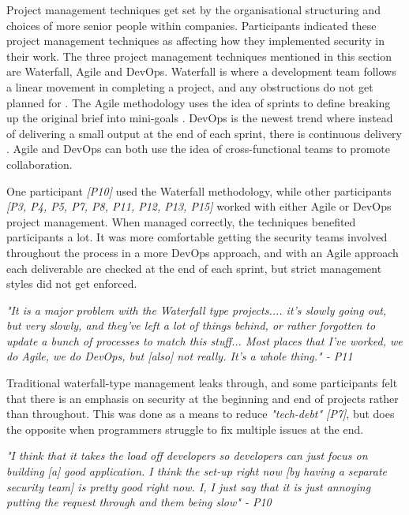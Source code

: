 \par Project management techniques get set by the organisational structuring and choices of more senior people within companies. Participants indicated these project management techniques as affecting how they implemented security in their work. The three project management techniques mentioned in this section are Waterfall, Agile and DevOps. Waterfall is where a development team follows a linear movement in completing a project, and any obstructions do not get planned for \cite{water}. The Agile methodology uses the idea of sprints to define breaking up the original brief into mini-goals \cite{water}. DevOps is the newest trend where instead of delivering a small output at the end of each sprint, there is continuous delivery \cite{ubiq}. Agile and DevOps can both use the idea of cross-functional teams to promote collaboration. 
\newline
\par 
One participant \textit{[P10]} used the Waterfall methodology, while other participants \textit{[P3, P4, P5, P7, P8, P11, P12, P13, P15]} worked with either Agile or DevOps project management. When managed correctly, the techniques benefited participants a lot. It was more comfortable getting the security teams involved throughout the process in a more DevOps approach, and with an Agile approach each deliverable are checked at the end of each sprint, but strict management styles did not get enforced. 
\newline
\par
\textit{"It is a major problem with the Waterfall type projects.... it's slowly going out, but very slowly, and they've left a lot of things behind, or rather forgotten to update a bunch of processes to match this stuff... Most places that I've worked, we do Agile, we do DevOps, but [also] not really. It's a whole thing." - P11}
\newline
\par
Traditional waterfall-type management leaks through, and some participants felt that there is an emphasis on security at the beginning and end of projects rather than throughout. This was done as a means to reduce \textit{"tech-debt" [P7]}, but does the opposite when programmers struggle to fix multiple issues at the end. 
\newline
\par 
\textit{"I think that it takes the load off developers so developers can just focus on building [a] good application. I think the set-up right now [by having a separate security team] is pretty good right now. I, I just say that it is just annoying putting the request through and them being slow" - P10}
